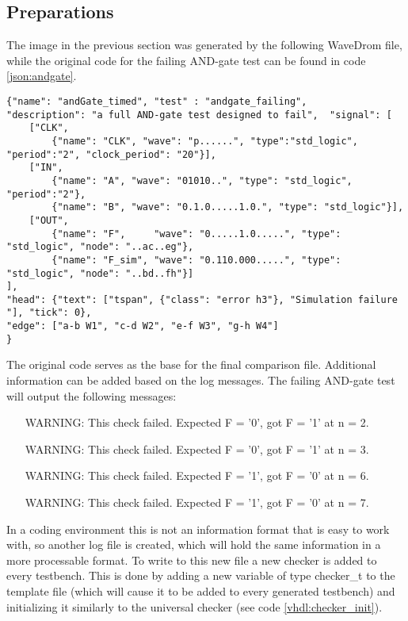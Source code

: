 \subsection{Preparations}
The image in the previous section was generated by the following WaveDrom file, while the original code for the failing AND-gate test can be found in code \ref{json:andgate}.
\begin{lstlisting}[style=json, caption={Source file for the proposed layout in fig \ref{fig:andgate_failing_result}}, label={json:andgate_failing_example}]
{"name": "andGate_timed", "test" : "andgate_failing", 
"description": "a full AND-gate test designed to fail",  "signal": [
	["CLK",
		{"name": "CLK", "wave": "p......", "type":"std_logic", "period":"2", "clock_period": "20"}],
	["IN",
		{"name": "A", "wave": "01010..", "type": "std_logic", "period":"2"},
		{"name": "B", "wave": "0.1.0.....1.0.", "type": "std_logic"}],
	["OUT",
		{"name": "F",     "wave": "0.....1.0.....", "type": "std_logic", "node": "..ac..eg"},
		{"name": "F_sim", "wave": "0.110.000.....", "type": "std_logic", "node": "..bd..fh"}]
], 
"head": {"text": ["tspan", {"class": "error h3"}, "Simulation failure "], "tick": 0}, 
"edge": ["a-b W1", "c-d W2", "e-f W3", "g-h W4"]
}
\end{lstlisting}\noindent
The original code serves as the base for the final comparison file. Additional information can be added based on the log messages.
\npar
The failing AND-gate test will output the following messages:
\begin{customenv}\label{somelabel}
	\begin{itemize}
		\item [WARNING:] This check failed. Expected F = '0', got F = '1' at n = 2.
		\item [WARNING:] This check failed. Expected F = '0', got F = '1' at n = 3.
		\item [WARNING:] This check failed. Expected F = '1', got F = '0' at n = 6.
		\item [WARNING:] This check failed. Expected F = '1', got F = '0' at n = 7.
	\end{itemize}
\end{customenv}\nline
In a coding environment this is not an information format that is easy to work with, so another log file is created, which will hold the same information in a more processable format. To write to this new file a new checker is added to every testbench. This is done by adding a new variable of type checker\_t to the template file (which will cause it to be added to every generated testbench) and initializing it similarly to the universal checker (see code \ref{vhdl:checker_init}).
